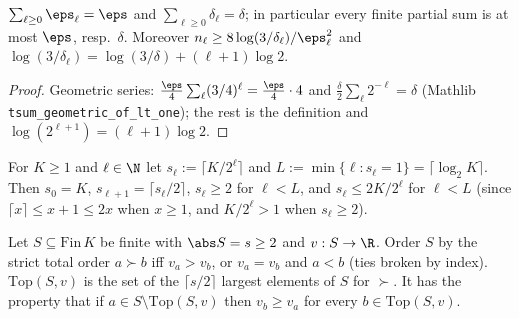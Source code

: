 \begin{lemma}\label{lem:me_schedule_sums}
\leanok
{}
$\sum_{\ell\ge0}\eps_\ell = \eps$ and $\sum_{\ell\ge0}\delta_\ell = \delta$; in particular every
finite partial sum is at most $\eps$, resp.\ $\delta$. Moreover $n_\ell\ge 8\log(3/\delta_\ell)/\eps_\ell^2$
and $\log(3/\delta_\ell) = \log(3/\delta) + (\ell+1)\log 2$.
\end{lemma}

\begin{proof}
\leanok
{}
Geometric series: $\frac\eps4\sum_\ell(3/4)^\ell = \frac\eps4\cdot4$ and
$\frac\delta2\sum_\ell 2^{-\ell} = \delta$ (Mathlib \texttt{tsum\_geometric\_of\_lt\_one}); the
rest is the definition and $\log(2^{\ell+1}) = (\ell+1)\log2$.
\end{proof}

\begin{definition}\label{def:pm_halving}
\leanok
For $K\ge1$ and $\ell\in\N$ let $s_\ell := \lceil K/2^\ell\rceil$ and
$L := \min\{\ell : s_\ell = 1\} = \lceil\log_2K\rceil$. Then $s_0 = K$,
$s_{\ell+1} = \lceil s_\ell/2\rceil$, $s_\ell\ge2$ for $\ell<L$, and $s_\ell\le 2K/2^\ell$ for
$\ell<L$ (since $\lceil x\rceil\le x+1\le 2x$ when $x\ge1$, and $K/2^\ell>1$ when $s_\ell\ge2$).
\end{definition}

\begin{definition}\label{def:pm_top}
\leanok
Let $S\subseteq\mathrm{Fin}\,K$ be finite with $\abs S = s\ge2$ and $v : S\to\R$. Order $S$ by the
strict total order $a\succ b$ iff $v_a>v_b$, or $v_a = v_b$ and $a<b$ (ties broken by index).
$\mathrm{Top}(S,v)$ is the set of the $\lceil s/2\rceil$ largest elements of $S$ for $\succ$.
It has the property that if $a\in S\setminus\mathrm{Top}(S,v)$ then $v_b\ge v_a$ for every
$b\in\mathrm{Top}(S,v)$.
\end{definition}

